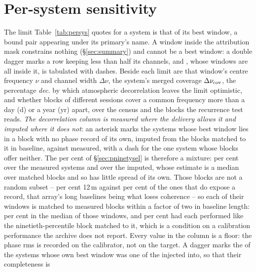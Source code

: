 \section{Per-system sensitivity}
\label{app:persys}

The limit Table~\ref{tab:persys} quotes for a system is that of its best
window, a bound pair appearing under its primary's name. A window inside the
attribution mask constrains nothing (\S\ref{sec:summary}) and cannot be a best
window: a double dagger marks a row keeping less than half its channels, and
\NSysALostName{}, whose \UmNWinALostWin{} windows are all inside it, is
tabulated with dashes. Beside each limit are that window's centre frequency
$\nu$ and channel width $\Delta\nu$, the system's merged coverage
$\Delta\nu_{\rm cov}$, the percentage \emph{dec.} by which atmospheric
decorrelation leaves the limit optimistic, and whether blocks of different
sessions cover a common frequency more than a day (d) or a year (yr) apart,
over the census and the \ZcNRecEB{} blocks the recurrence test reads. \emph{The decorrelation column is measured where the delivery allows
it and imputed where it does not}: an asterisk marks the
\NgNDecImpSys{} systems whose best window lies in a block with no phase record
of its own, imputed from the blocks matched to it in baseline, against
\NgNDecMeasSys{} measured, with a dash for the one system whose
blocks offer neither. The \NmDecSysMedPct{} per cent of
\S\ref{sec:pninetysel} is therefore a mixture: \NgDecMeasMedPct{} per cent
over the measured systems and \NgDecImpMedPct{} over the imputed, whose
estimate is a median over matched blocks and so has little spread of its own. Those blocks are not a random subset -- \NbDecPctTwelveUn{} per cent
12\,m against \NbDecPctTwelveMeas{} per cent of the ones that do expose a
record, that array's long baselines being what loses coherence -- so each of
their windows is matched to measured blocks within a factor of two in baseline
length: \RpDecMatchMed{} per cent in the median of those windows, and
\RpDecMatchHi{} per cent had each performed like the ninetieth-percentile
block matched to it, which is a condition on a calibration performance the
archive does not report. Every value in the column is a floor: the phase rms
is recorded on the calibrator, not on the target.
A dagger marks the \SmcNMeasSys{} of the \NSysALim{} systems whose own best
window was one of the \SensNInj{} injected into, so that their completeness is
